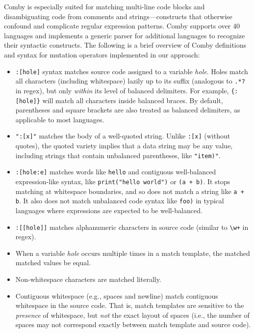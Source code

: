 \documentclass[sigconf,review, anonymous]{acmart}
\begin{document}
{Comby is especially suited for matching multi-line code blocks and
disambiguating code from comments and strings---constructs that otherwise
confound and complicate regular expression patterns. Comby supports over 40
languages and implements a generic parser for additional languages to recognize
their syntactic constructs. The following is a brief overview of Comby
definitions and syntax for mutation operators implemented in our approach:

\begin{itemize}

\item \texttt{\small:[hole]} syntax matches source code assigned to a variable \emph{hole}. Holes match all characters (including whitespace) lazily up to its suffix (analogous to \texttt{\small.*?} in regex), but only \emph{within} its level of balanced delimiters. For example, \texttt{\small\{:[hole]\}} will match all characters inside balanced braces. By default, parentheses and square brackets are also treated as balanced delimiters, as applicable to most languages. 

\item \texttt{\small ":[x]"} matches the body of a well-quoted string. Unlike \texttt{\small :[x]} (without quotes), the quoted variety implies that a data string may be any value, including strings that contain unbalanced parentheses, like \texttt{\small "item)"}.

\item \texttt{\small:[hole:e]} matches words like \texttt{\small hello} and contiguous well-balanced expression-like syntax, like \texttt{\small print("hello world")} or \texttt{\small (a + b)}. It stops matching at whitespace boundaries, and so does not match a string like \texttt{\small a + b}. It also does not match unbalanced code syntax like \texttt{\small foo)} in typical languages where expressions are expected to be well-balanced.

\item \texttt{\small :[[hole]]} matches alphanumeric characters in source code (similar to \texttt{\small\textbackslash w+} in regex).

\item When a variable \emph{hole} occurs multiple times in a match template, the matched matched values be equal.

\item Non-whitespace characters are matched literally.

\item Contiguous whitespace (e.g., spaces and newline) match contiguous whitespace in the source code. That is, match templates are sensitive to the \emph{presence} of whitespace, but \emph{not} the exact layout of spaces (i.e., the number of spaces may not correspond exactly between match template and source code).


\end{itemize}}
\end{document}
